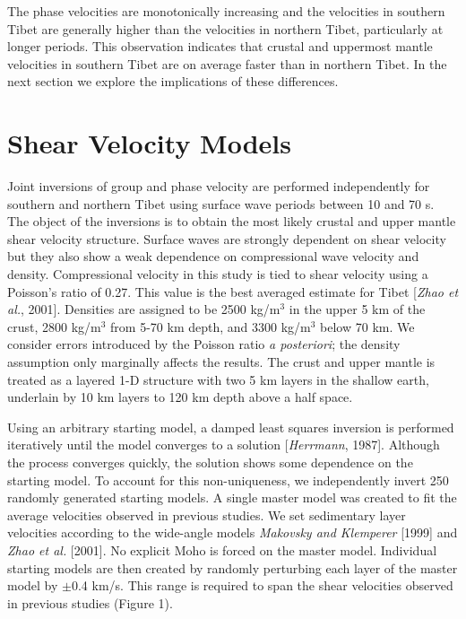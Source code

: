 \documentclass[12pt]{article}
\begin{document}
The phase velocities are monotonically increasing and the velocities in southern Tibet are generally higher
than the velocities in northern Tibet, particularly at longer periods.  This observation indicates that
crustal and uppermost mantle velocities in southern Tibet are on average faster than in northern Tibet.  In
the next section we explore the implications of these differences.

\section{Shear Velocity Models}

Joint inversions of group and phase velocity are performed independently for southern and northern Tibet
using surface wave periods between 10 and 70 s.   The object of the inversions is to obtain the most likely
crustal and upper mantle shear velocity structure.  Surface waves are strongly dependent on shear
velocity but they also show a weak dependence on compressional wave velocity and density.  Compressional
velocity in this study is tied to shear velocity using a Poisson's ratio of 0.27.  This value is the best
averaged estimate for Tibet [{\it Zhao et al.}, 2001].  Densities are assigned to be 2500 kg/m$^3$ in the upper
5 km of the crust, 2800 kg/m$^3$ from 5-70 km depth, and 3300 kg/m$^3$ below 70 km.  We consider errors
introduced by the Poisson ratio {\it a posteriori}; the density
assumption only marginally affects the results.  The crust and upper mantle is
treated as a layered 1-D structure with two 5 km layers in the shallow earth, underlain by 10 km layers to
120 km depth above a half space.

Using an arbitrary starting model, a damped least squares inversion is performed iteratively until the model converges to a
solution [{\it Herrmann}, 1987].  Although the process converges quickly, the solution shows some dependence on the starting model.
To account for this non-uniqueness, we independently invert 250 randomly generated starting models.  A single master model
was created to fit the average velocities observed in previous studies.  We set sedimentary layer
velocities according to the wide-angle models {\it
Makovsky and Klemperer} [1999] and {\it Zhao et
al.} [2001].  No explicit Moho is forced on the master model.  Individual starting models are then created
by randomly perturbing each layer of the master model by $\pm$0.4 km/s.  This range is required to span the
shear velocities observed in previous studies (Figure 1).
\end{document}
